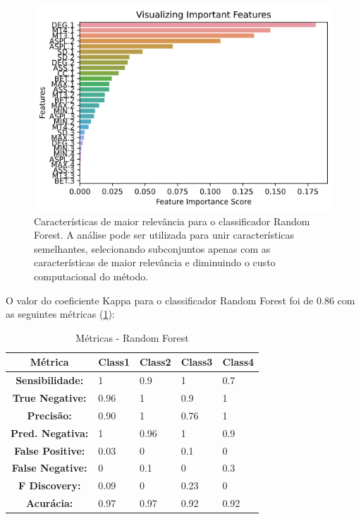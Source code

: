 \documentclass[
	article,			%
	11pt,				%
	oneside,			%
	a4paper,			%
	english,			%
	brazil,				%
	sumario=tradicional
	]{abntex2}
\begin{document}
\begin{figure}[H]
 \centering
 \includegraphics[scale=0.7]{fig/rf_feat.png}
 \caption{Características de maior relevância para o classificador Random Forest. A análise pode ser utilizada para unir características semelhantes, selecionando subconjuntos apenas com as características de maior relevância e diminuindo o custo computacional do método.}
 \label{fig:rf_feat}
\end{figure}

O valor do coeficiente Kappa para o classificador Random Forest foi de $0.86$ com as seguintes métricas (\ref{tab:metrics_rf}):

\begin{table}[H]
\centering
\begin{tabular}{|c|l|l|l|l|}
\hline
\textbf{Métrica}         & \textbf{Class1} & \textbf{Class2} & \textbf{Class3} & \textbf{Class4} \\ \hline
\textbf{Sensibilidade:}  & 1               & 0.9             & 1               & 0.7             \\ \hline
\textbf{True Negative:}  & 0.96            & 1               & 0.9             & 1               \\ \hline
\textbf{Precisão:}       & 0.90            & 1               & 0.76            & 1               \\ \hline
\textbf{Pred. Negativa:} & 1               & 0.96            & 1               & 0.9             \\ \hline
\textbf{False Positive:} & 0.03            & 0               & 0.1             & 0               \\ \hline
\textbf{False Negative:} & 0               & 0.1             & 0               & 0.3             \\ \hline
\textbf{F Discovery:}    & 0.09            & 0               & 0.23            & 0               \\ \hline
\textbf{Acurácia:}       & 0.97            & 0.97            & 0.92            & 0.92            \\ \hline
\end{tabular}
\caption{Métricas - Random Forest}
\label{tab:metrics_rf}
\end{table}
\end{document}
